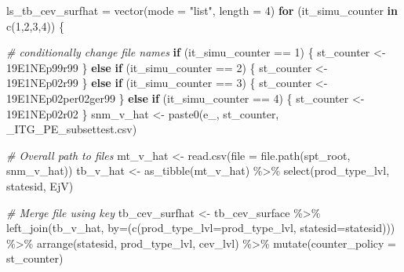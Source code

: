 \documentclass[
]{article}
\newenvironment{Shaded}{\begin{snugshade}}{\end{snugshade}}
\newcommand{\AttributeTok}[1]{\textcolor[rgb]{0.77,0.63,0.00}{#1}}
\newcommand{\CommentTok}[1]{\textcolor[rgb]{0.56,0.35,0.01}{\textit{#1}}}
\newcommand{\ControlFlowTok}[1]{\textcolor[rgb]{0.13,0.29,0.53}{\textbf{#1}}}
\newcommand{\DecValTok}[1]{\textcolor[rgb]{0.00,0.00,0.81}{#1}}
\newcommand{\FunctionTok}[1]{\textcolor[rgb]{0.00,0.00,0.00}{#1}}
\newcommand{\NormalTok}[1]{#1}
\newcommand{\OtherTok}[1]{\textcolor[rgb]{0.56,0.35,0.01}{#1}}
\newcommand{\SpecialCharTok}[1]{\textcolor[rgb]{0.00,0.00,0.00}{#1}}
\newcommand{\StringTok}[1]{\textcolor[rgb]{0.31,0.60,0.02}{#1}}
\begin{document}
\begin{Shaded}
\begin{Highlighting}[]
\NormalTok{ls\_tb\_cev\_surfhat }\OtherTok{=} \FunctionTok{vector}\NormalTok{(}\AttributeTok{mode =} \StringTok{"list"}\NormalTok{, }\AttributeTok{length =} \DecValTok{4}\NormalTok{)}
\ControlFlowTok{for}\NormalTok{ (it\_simu\_counter }\ControlFlowTok{in} \FunctionTok{c}\NormalTok{(}\DecValTok{1}\NormalTok{,}\DecValTok{2}\NormalTok{,}\DecValTok{3}\NormalTok{,}\DecValTok{4}\NormalTok{)) \{}

    \CommentTok{\# conditionally change file names}
    \ControlFlowTok{if}\NormalTok{ (it\_simu\_counter }\SpecialCharTok{==} \DecValTok{1}\NormalTok{) \{}
\NormalTok{        st\_counter }\OtherTok{\textless{}{-}} \StringTok{\textquotesingle{}19E1NEp99r99\textquotesingle{}}
\NormalTok{    \} }\ControlFlowTok{else} \ControlFlowTok{if}\NormalTok{ (it\_simu\_counter }\SpecialCharTok{==} \DecValTok{2}\NormalTok{) \{}
\NormalTok{        st\_counter }\OtherTok{\textless{}{-}} \StringTok{\textquotesingle{}19E1NEp02r99\textquotesingle{}}
\NormalTok{    \} }\ControlFlowTok{else} \ControlFlowTok{if}\NormalTok{ (it\_simu\_counter }\SpecialCharTok{==} \DecValTok{3}\NormalTok{) \{}
\NormalTok{        st\_counter }\OtherTok{\textless{}{-}} \StringTok{\textquotesingle{}19E1NEp02per02ger99\textquotesingle{}}
\NormalTok{    \} }\ControlFlowTok{else} \ControlFlowTok{if}\NormalTok{ (it\_simu\_counter }\SpecialCharTok{==} \DecValTok{4}\NormalTok{) \{}
\NormalTok{        st\_counter }\OtherTok{\textless{}{-}} \StringTok{\textquotesingle{}19E1NEp02r02\textquotesingle{}}
\NormalTok{    \}}
\NormalTok{    snm\_v\_hat }\OtherTok{\textless{}{-}} \FunctionTok{paste0}\NormalTok{(}\StringTok{\textquotesingle{}e\_\textquotesingle{}}\NormalTok{, st\_counter, }\StringTok{\textquotesingle{}\_ITG\_PE\_subsettest.csv\textquotesingle{}}\NormalTok{)}
    
    \CommentTok{\# Overall path to files}
\NormalTok{    mt\_v\_hat }\OtherTok{\textless{}{-}} \FunctionTok{read.csv}\NormalTok{(}\AttributeTok{file =} \FunctionTok{file.path}\NormalTok{(spt\_root, snm\_v\_hat))}
\NormalTok{    tb\_v\_hat }\OtherTok{\textless{}{-}} \FunctionTok{as\_tibble}\NormalTok{(mt\_v\_hat) }\SpecialCharTok{\%\textgreater{}\%}
      \FunctionTok{select}\NormalTok{(prod\_type\_lvl, statesid, EjV)}
    
    \CommentTok{\# Merge file using key }
\NormalTok{    tb\_cev\_surfhat }\OtherTok{\textless{}{-}}\NormalTok{ tb\_cev\_surface }\SpecialCharTok{\%\textgreater{}\%}
      \FunctionTok{left\_join}\NormalTok{(tb\_v\_hat, }\AttributeTok{by=}\NormalTok{(}\FunctionTok{c}\NormalTok{(}\StringTok{\textquotesingle{}prod\_type\_lvl\textquotesingle{}}\OtherTok{=}\StringTok{\textquotesingle{}prod\_type\_lvl\textquotesingle{}}\NormalTok{, }
                                \StringTok{\textquotesingle{}statesid\textquotesingle{}}\OtherTok{=}\StringTok{\textquotesingle{}statesid\textquotesingle{}}\NormalTok{))) }\SpecialCharTok{\%\textgreater{}\%}
      \FunctionTok{arrange}\NormalTok{(statesid, prod\_type\_lvl, cev\_lvl) }\SpecialCharTok{\%\textgreater{}\%}
      \FunctionTok{mutate}\NormalTok{(}\AttributeTok{counter\_policy =}\NormalTok{ st\_counter)}
    

\end{Highlighting}
\end{Shaded}
\end{document}
